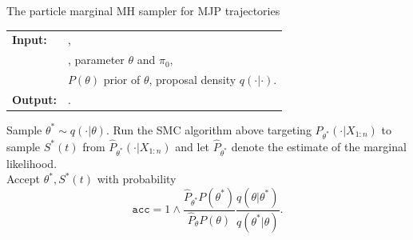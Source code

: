 \begin{algorithm}[H]
  \caption{The particle marginal MH sampler for MJP trajectories}
   \label{alg:SMC}
  \begin{tabular}{l l}
   \textbf{Input:  } & \text{The observations $X$, the MJP path $S(t) = (s_0, S, T)$},\\
                       &\text{number of particles $N$}, parameter $\theta$ and $\pi_0$,\\
                     & $P(\theta)$ prior of $\theta$, proposal density $q(\cdot|\cdot)$. \\
   \textbf{Output:  }& \text{New MJP trajectory $S' (t) = (s'_0, S', T')$}.\\
   \hline
   \end{tabular}
   \begin{algorithmic}[1]
\State Sample $\theta^* \sim q(\cdot | \theta)$.
\State Run the SMC algorithm above targeting $P_{\theta^*}(\cdot | X_{1:n})$ to sample $S^*(t)$ from $\hat{P}_{\theta^*}(\cdot | X_{1:n})$ and let $\hat{P}_{\theta^*}$ denote the estimate of the marginal likelihood.\\
Accept $\theta^*, S^*(t)$ with probability $$ \mathtt{acc} = 1 \wedge \frac{\hat{P}_{\theta^*} P(\theta^*)}{\hat{P}_{\theta} P(\theta)} \frac{q(\theta | \theta^*)}{q(\theta^* | \theta)}.$$

\end{algorithmic}
\end{algorithm}


